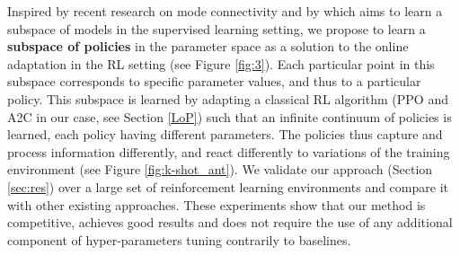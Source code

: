 Inspired by recent research on mode connectivity \citep{BentonMLW21,KuditipudiWLZLH19} and by \citep{LearningSubspaces} which aims to learn a subspace of models in the supervised learning setting, we propose to learn a \textbf{subspace of policies} in the parameter space as a solution to the online adaptation in the RL setting (see Figure \ref{fig:3}). Each particular point in this subspace corresponds to specific parameter values, and thus to a particular policy. This subspace is learned by adapting a classical RL algorithm (PPO and A2C in our case, see Section \ref{LoP}) such that an infinite continuum of policies is learned, each policy having different parameters. The policies thus capture and process information differently, and react differently to variations of the training environment (see Figure \ref{fig:k-shot_ant}). 
We validate our approach (Section \ref{sec:res}) over a large set of reinforcement learning environments and compare it with other existing approaches. These experiments show that our method is competitive, achieves good results and does not require the use of any additional component of hyper-parameters tuning contrarily to baselines. 



